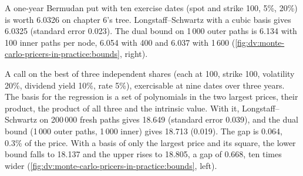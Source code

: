 \begin{example}\label{ex:dv:monte-carlo-pricers-in-practice:inner}
A one-year Bermudan put with ten exercise dates (spot and strike 100, 5\%, 20\%) is worth 6.0326 on chapter 6's tree. Longstaff--Schwartz with a
cubic basis gives 6.0325 (standard error 0.023). The dual bound on 1\,000 outer paths is 6.134 with 100 inner paths per node, 6.054 with 400 and
6.037 with 1\,600 (\cref{fig:dv:monte-carlo-pricers-in-practice:bounds}, right).
\end{example}

\begin{example}\label{ex:dv:monte-carlo-pricers-in-practice:maxcall}
A call on the best of three independent shares (each at 100, strike 100, volatility 20\%, dividend yield 10\%, rate 5\%), exercisable at nine dates
over three years. The basis for the regression is a set of polynomials in the two largest prices, their product, the product of all three and the
intrinsic value. With it, Longstaff--Schwartz on 200\,000 fresh paths gives 18.649 (standard error 0.039), and the dual bound (1\,000 outer paths,
1\,000 inner) gives 18.713 (0.019). The gap is 0.064, 0.3\% of the price. With a basis of only the largest price and its square, the lower bound
falls to 18.137 and the upper rises to 18.805, a gap of 0.668, ten times wider
(\cref{fig:dv:monte-carlo-pricers-in-practice:bounds}, left).
\end{example}

